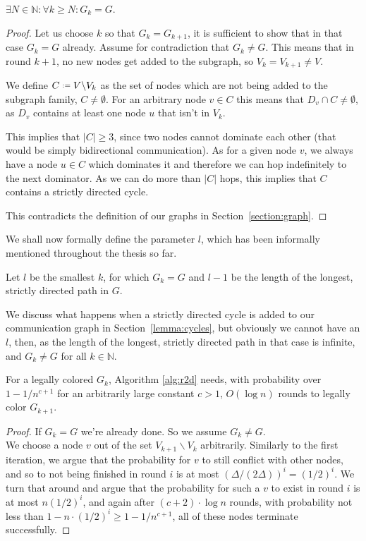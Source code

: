 \begin{lemma}
\label{theorem:r2dlaenge}
	$\exists N \in  \mathbb{N} : \forall k \geq N : G_k = G$.
\end{lemma}
\begin{proof}
	Let us choose $k$ so that $G_k = G_{k+1}$, it is sufficient to show that in that case $G_k = G$ already.
	Assume for contradiction that $G_k \neq G$. This means that in round $k+1$, no new nodes get added to the subgraph, so $V_k = V_{k+1} \neq V$. 
	
	We define $C \defines V \backslash V_k$ as the set of nodes which are not being added to the subgraph family, $C \neq \emptyset$. For an arbitrary node $v \in C$ this means that $D_v \cap C \neq \emptyset$, as $D_v$ contains at least one node $u$ that isn't in $V_k$.
	
	This implies that $|C| \geq 3$, since two nodes cannot dominate each other (that would be simply bidirectional communication). As for a given node $v$, we always have a node $u \in C$ which dominates it and therefore we can hop indefinitely to the next dominator. As we can do more than $|C|$ hops, this implies that $C$ contains a strictly directed cycle.
	
	This contradicts the definition of our graphs in Section~\ref{section:graph}.
\end{proof}

We shall now formally define the parameter $l$, which has been informally mentioned throughout the thesis so far.

\begin{definition}\label{definition:length}
Let $l$ be the smallest $k$, for which $G_k = G$ and $l-1$ be the length of the longest, strictly directed path in $G$.
\end{definition}

We discuss what happens when a strictly directed cycle is added to our communication graph in Section~\ref{lemma:cycles}, but obviously we cannot have an $l$, then, as the length of the longest, strictly directed path in that case is infinite, and $G_k \neq G$ for all $k \in \mathbb{N}$.

\begin{lemma}
\label{theorem:r2diteration}
	For a legally colored $G_k$, Algorithm \ref{alg:r2d} needs, with probability over $1-1/n^{c+1}$ for an arbitrarily large constant $c>1$, $O(\log n)$ rounds to legally color $G_{k+1}$.
\end{lemma}
\begin{proof}
	If $G_k = G$ we're already done.
	So we assume $G_k \neq G$.\\
	We choose a node $v$ out of the set $V_{k+1}\backslash V_k$ arbitrarily. Similarly to the first iteration, we argue that the probability for $v$ to still conflict with other nodes, and so to not being finished in round $i$ is at most $(\Delta /(2\Delta))^i = (1/2)^i$. We turn that around and argue that the probability for such a $v$ to exist in round $i$ is at most $n (1/2)^i$, and again after $(c+2) \cdot \log n$ rounds, with probability not less than $1-n \cdot (1/2)^i \geq 1-1/n^{c+1}$, all of these nodes terminate successfully.
\end{proof}

